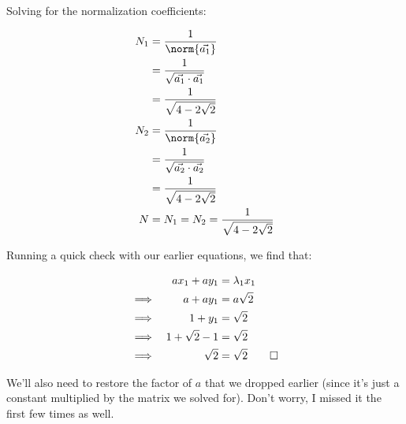 \begin{answer}
  Solving for the normalization coefficients:
  
  \begin{equation}
    \begin{split}
      N_1 &= \frac{1}{\norm{\vec{a_1}}}\\
      &= \frac{1}{\sqrt{\vec{a_1} \cdot \vec{a_1}}}\\
      &= \frac{1}{\sqrt{4 - 2\sqrt{2}}}\\
      N_2 &= \frac{1}{\norm{\vec{a_2}}}\\
      &= \frac{1}{\sqrt{\vec{a_2} \cdot \vec{a_2}}}\\
      &= \frac{1}{\sqrt{4 - 2\sqrt{2}}}\\
      N &= N_1 = N_2 = \frac{1}{\sqrt{4 - 2\sqrt{2}}}\\
    \end{split}
  \end{equation}

  Running a quick check with our earlier equations, we find that:

  \begin{equation}
    \begin{alignedat}{2}
      & & ax_1 + ay_1 &= \lambda_1x_1\\
      \implies \quad & & a + ay_1 &= a\sqrt{2}\\
      \implies \quad & & 1 + y_1 &= \sqrt{2}\\
      \implies \quad & & 1 + \sqrt{2} - 1 &= \sqrt{2}\\
      \implies \quad & & \sqrt{2} &= \sqrt{2}\qed\\
    \end{alignedat}
  \end{equation}

  We'll also need to restore the factor of $a$ that we dropped earlier
  (since it's just a constant multiplied by the matrix we solved for).
  Don't worry, I missed it the first few times as well.


\end{answer}
